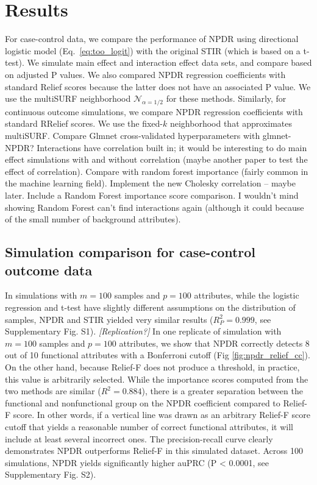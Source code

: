 \documentclass[10pt]{article}
\begin{document}

\section{Results}
For case-control data, we compare the performance of NPDR using directional logistic model (Eq.~\ref{eq:too_logit}) with the original STIR (which is based on a t-test).
We simulate main effect and interaction effect data sets, and compare based on adjusted P values.
We also compared NPDR regression coefficients with standard Relief scores because the latter does not have an associated P value. We use the multiSURF neighborhood $\mathcal{N}_{\alpha=1/2}$ for these methods.
Similarly, for continuous outcome simulations, we compare NPDR regression coefficients with standard RRelief scores. We use the fixed-$k$ neighborhood that approximates multiSURF. Compare Glmnet cross-validated hyperparameters with glmnet-NPDR? Interactions have correlation built in; it would be interesting to do main effect simulations with and without correlation (maybe another paper to test the effect of correlation). Compare with random forest importance (fairly common in the machine learning field). Implement the new Cholesky correlation -- maybe later. Include a Random Forest importance score comparison. I wouldn't mind showing Random Forest can't find interactions again (although it could because of the small number of background attributes). 

\subsection{Simulation comparison for case-control outcome data} 
In simulations with $m = 100$ samples and $p = 100$ attributes, while the logistic regression and t-test have slightly different assumptions on the distribution of samples, NPDR and STIR yielded very similar results ($R_P^2 = 0.999$, see Supplementary Fig. S1). \emph{[Replication?]}
In one replicate of simulation with $m = 100$ samples and $p = 100$ attributes, we show that NPDR correctly detects 8 out of 10 functional attributes with a Bonferroni cutoff (Fig \ref{fig:npdr_relief_cc}).
On the other hand, because Relief-F does not produce a threshold, in practice, this value is arbitrarily selected.
While the importance scores computed from the two methods are similar ($R^2 = 0.884$), there is a greater separation between the functional and nonfunctional group on the NPDR coefficient compared to Relief-F score.
In other words, if a vertical line was drawn as an arbitrary Relief-F score cutoff that yields a reasonable number of correct functional attributes, it will include at least several incorrect ones. 
The precision-recall curve clearly demonstrates NPDR outperforms Relief-F in this simulated dataset.
Across 100 simulations, NPDR yields significantly higher auPRC (P < 0.0001, see Supplementary Fig. S2).
\end{document}
